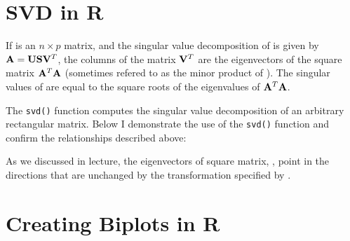 

\section*{SVD in R}


If  is an $n \times p$ matrix, and the singular value decomposition of  is given by $\mathbf{A} = \mathbf{U} \mathbf{S} \mathbf{V}^T$, the columns of the  matrix $\mathbf{V}^T$ are the eigenvectors of the square matrix $\mathbf{A}^T \mathbf{A}$ (sometimes refered to  as the minor product of ). The singular values of  are equal to the square roots of the eigenvalues of $\mathbf{A}^T \mathbf{A}$. 

The \texttt{svd()} function computes the singular value decomposition of an arbitrary rectangular matrix. Below I demonstrate the use of the \texttt{svd()} function and confirm the relationships described above:



As we discussed in lecture, the eigenvectors of square matrix, , point in the directions that are unchanged by the transformation specified by .



\section*{Creating Biplots in R}

